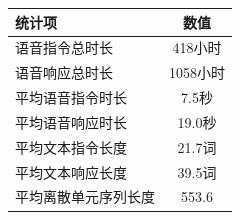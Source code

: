 \begin{table}[!htbp]
    \label{tab:llamaomni_data}
    \centering
    \small
    \begin{tabular}{lc}
        \toprule
        \textbf{统计项} & \textbf{数值} \\
        \midrule
        语音指令总时长 & 418小时 \\
        语音响应总时长 & 1058小时 \\
        平均语音指令时长 & 7.5秒 \\
        平均语音响应时长 & 19.0秒 \\
        平均文本指令长度 & 21.7词 \\
        平均文本响应长度 & 39.5词 \\
        平均离散单元序列长度 & 553.6 \\
        \bottomrule
    \end{tabular}
\end{table}

